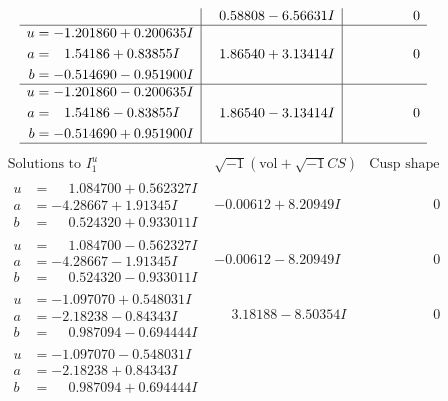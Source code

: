 \documentclass[1p]{elsarticle_modified}
\theoremstyle{definition}
\newcommand{\I}{\sqrt{-1}}
\begin{document}
$$\begin{array}{c|c|c}
 & \phantom{-}0.58808 - 6.56631 I & \phantom{-0.000000 } 0 \\ \hline\begin{aligned}
u &= -1.201860 + 0.200635 I \\
a &= \phantom{-}1.54186 + 0.83855 I \\
b &= -0.514690 - 0.951900 I\end{aligned}
 & \phantom{-}1.86540 + 3.13414 I & \phantom{-0.000000 } 0 \\ \hline\begin{aligned}
u &= -1.201860 - 0.200635 I \\
a &= \phantom{-}1.54186 - 0.83855 I \\
b &= -0.514690 + 0.951900 I\end{aligned}
 & \phantom{-}1.86540 - 3.13414 I & \phantom{-0.000000 } 0\\
 \hline 
 \end{array}$$\newpage$$\begin{array}{c|c|c}  
\text{Solutions to }I^u_{1}& \I (\text{vol} + \sqrt{-1}CS) & \text{Cusp shape}\\
 \hline 
\begin{aligned}
u &= \phantom{-}1.084700 + 0.562327 I \\
a &= -4.28667 + 1.91345 I \\
b &= \phantom{-}0.524320 + 0.933011 I\end{aligned}
 & -0.00612 + 8.20949 I & \phantom{-0.000000 } 0 \\ \hline\begin{aligned}
u &= \phantom{-}1.084700 - 0.562327 I \\
a &= -4.28667 - 1.91345 I \\
b &= \phantom{-}0.524320 - 0.933011 I\end{aligned}
 & -0.00612 - 8.20949 I & \phantom{-0.000000 } 0 \\ \hline\begin{aligned}
u &= -1.097070 + 0.548031 I \\
a &= -2.18238 - 0.84343 I \\
b &= \phantom{-}0.987094 - 0.694444 I\end{aligned}
 & \phantom{-}3.18188 - 8.50354 I & \phantom{-0.000000 } 0 \\ \hline\begin{aligned}
u &= -1.097070 - 0.548031 I \\
a &= -2.18238 + 0.84343 I \\
b &= \phantom{-}0.987094 + 0.694444 I\end{aligned}

\end{array}$$
\end{document}
